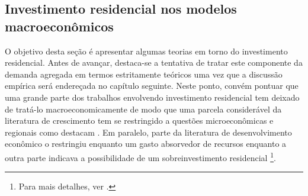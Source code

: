 \subsection{Investimento residencial nos modelos macroeconômicos}
\label{RevResidencial}

O objetivo desta seção é apresentar algumas teorias em torno do investimento residencial. 
Antes de avançar, destaca-se a tentativa de tratar este componente da demanda agregada em termos estritamente teóricos uma vez que a discussão empírica será endereçada no capítulo seguinte. 
Neste ponto, convém pontuar que uma grande parte dos trabalhos envolvendo investimento residencial tem deixado de tratá-lo macroeconomicamente de modo que uma parcela considerável da literatura de crescimento tem se restringido a questões microeconômicas e regionais como destacam \textcite{arestis_u.s._2008}.
Em paralelo, parte da literatura de desenvolvimento econômico o restringiu enquanto um gasto absorvedor de recursos \cite{solow_importance_1995} enquanto a outra parte indicava  a possibilidade de um sobreinvestimento residencial \cite{mills_has_1987}\footnote{Para mais detalhes, ver \textcite{arku_housing_2006}.}.


